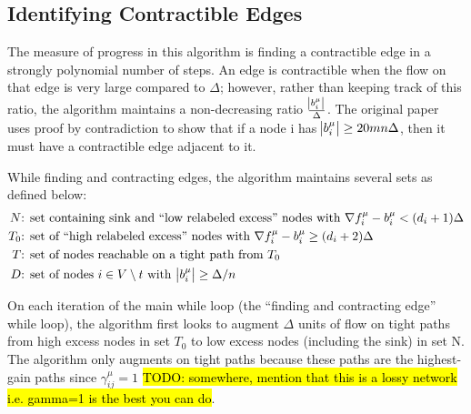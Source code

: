 \documentclass[11pt]{article}
\theoremstyle{definition}
\theoremstyle{definition}
\theoremstyle{definition}
\newcommand{\fu}{f^{\mu}}
\newcommand{\nfiu}{\nabla \fu_i}
\newcommand{\biu}{b_{i}^{\mu}}
\renewcommand{\todo}[1]{\hl{TODO: #1}}
\begin{document}
\subsection{Identifying Contractible Edges}
The measure of progress in this algorithm is finding a contractible edge in a strongly polynomial number of steps. An edge is contractible when the flow on that edge is very large compared to $\Delta$; however, rather than keeping track of this ratio, the algorithm maintains a non-decreasing ratio $\frac{\abs{b_i^\mu}}{\Delta}$. The original paper uses proof by contradiction to show that if a node i has $\abs{b_i^\mu} \geq 20mn\Delta$, then it must have a contractible edge adjacent to it. 

While finding and contracting edges, the algorithm maintains several sets as defined below:
	\begin{align*}
	N&\text{: set containing sink and ``low relabeled excess'' nodes with }
            \nfiu - \biu < (d_i +1)\Delta \\
	T_0&\text{: set of ``high relabeled excess'' nodes with } \nfiu - \biu \geq (d_i + 2)\Delta \\
	T&\text{: set of nodes reachable on a tight path from $T_0$ } \\ 
	D&\text{: set of nodes $i \in V \setminus t$ with } \abs{b_i^\mu} \geq \Delta / n
	\end{align*}

On each iteration of the main while loop (the ``finding and contracting edge'' while loop), the algorithm first looks to augment $\Delta$ units of flow on tight paths from high excess nodes in set $T_0$ to low excess nodes (including the sink) in set N. The algorithm only augments on tight paths because these paths are the highest-gain paths since $\gamma_{ij}^\mu = 1$ \todo{somewhere, mention that this is a lossy network i.e. gamma=1 is the best you can do}. 

\end{document}
